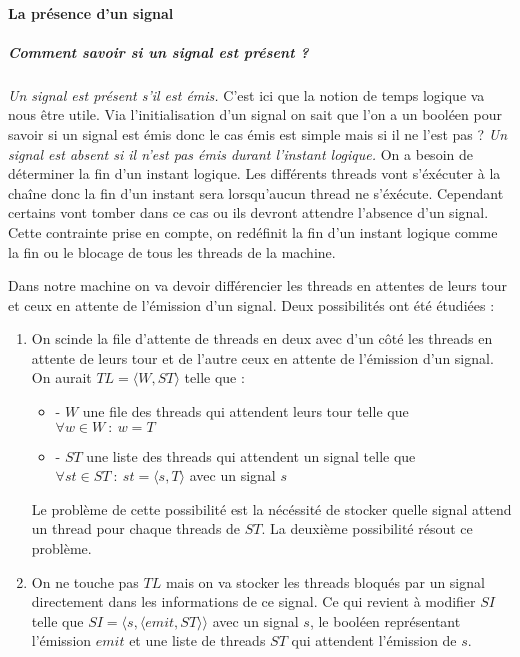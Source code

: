 \documentclass[10pt,a4paper]{report}
\begin{document}
\paragraph{La présence d'un signal}

\subparagraph{Comment savoir si un signal est présent ?}
\textit{Un signal est présent s'il est émis.}
\smallbreak
C'est ici que la notion de temps logique va nous être utile. Via l'initialisation d'un signal on sait que l'on a un booléen pour savoir si un signal est émis donc le cas émis est simple mais si il ne l'est pas ? 
\smallbreak
\textit{Un signal est absent si il n'est pas émis durant l'instant logique.}
\smallbreak
On a besoin de déterminer la fin d'un instant logique. Les différents threads vont s'éxécuter à la chaîne donc la fin d'un instant sera lorsqu'aucun thread ne s'éxécute. Cependant certains vont tomber dans ce cas ou ils devront attendre l'absence d'un signal. Cette contrainte prise en compte, on redéfinit la fin d'un instant logique comme la fin ou le blocage de tous les threads de la machine.
\medbreak

Dans notre machine on va devoir différencier les threads en attentes de leurs tour et ceux en attente de l'émission d'un signal. Deux possibilités ont été étudiées :
\begin{enumerate}
\item On scinde la file d'attente de threads en deux avec d'un côté les threads en attente de leurs tour et de l'autre ceux en attente de l'émission d'un signal. On aurait $TL =\langle W,ST\rangle$ telle que :
  \begin{itemize}
  \item[] - $W$ une file des threads qui attendent leurs tour telle que $\forall w \in W~:~w = T$ 
  \item[] - $ST$ une liste des threads qui attendent un signal telle que $\forall st \in ST~:~st = \langle s,T\rangle$ avec un signal $s$ 
  \end{itemize}
  \medbreak
  
  Le problème de cette possibilité est la nécéssité de stocker quelle signal attend un thread pour chaque threads de $ST$. La deuxième possibilité résout ce problème.
\item On ne touche pas $TL$ mais on va stocker les threads bloqués par un signal directement dans les informations de ce signal. Ce qui revient à modifier $SI$ telle que $SI = \langle s , \langle emit , ST \rangle\rangle$ avec un signal $s$, le booléen représentant l'émission $emit$ et une liste de threads $ST$ qui attendent l'émission de $s$.
\end{enumerate}
\medbreak
\end{document}
